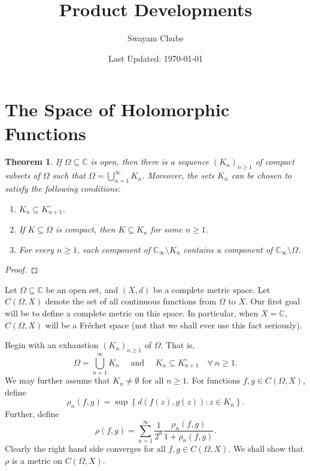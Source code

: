 \documentclass[11pt]{article}
\theoremstyle{thmstyle}
\newtheorem{theorem}{Theorem}[section]
\theoremstyle{defstyle}
\newcommand{\bbC}{\mathbb{C}}
\renewcommand{\ge}{\geqslant}
\begin{document}
\title{Product Developments}
\author{Swayam Chube}
\date{Last Updated: \today}
\maketitle
\tableofcontents

\section{The Space of Holomorphic Functions}

\begin{theorem}
    If $\Omega\subseteq\bbC$ is open, then there is a sequence $(K_n)_{n\ge 1}$ of compact subsets of $\Omega$ such that $\displaystyle\Omega = \bigcup_{n = 1}^\infty K_n$. Moreover, the sets $K_n$ can be chosen to satisfy the following conditions: 
    \begin{enumerate}[label=(\roman*)]
        \item $K_n\subseteq K_{n + 1}^\circ$.
        \item If $K\subseteq\Omega$ is compact, then $K\subseteq K_n$ for some $n\ge 1$. 
        \item For every $n\ge 1$, each component of $\bbC_\infty\setminus K_n$ contains a component of $\bbC_\infty\setminus\Omega$.
    \end{enumerate}
\end{theorem}
\begin{proof}
\end{proof}

Let $\Omega\subseteq\bbC$ be an open set, and $(X, d)$ be a complete metric space. Let $C(\Omega, X)$ denote the set of all continuous functions from $\Omega$ to $X$. Our first goal will be to define a complete metric on this space. In particular, when $X = \bbC$, $C(\Omega, X)$ will be a Fr\'echet space (not that we shall ever use this fact seriously).


Begin with an exhaustion $(K_n)_{n\ge 1}$ of $\Omega$. That is, 
\begin{equation*}
    \Omega = \bigcup_{n = 1}^\infty K_n\quad\text{ and }\quad K_n\subseteq K_{n + 1}^\circ\quad\forall~n\ge 1.
\end{equation*}
We may further assume that $K_n\ne\emptyset$ for all $n\ge 1$. For functions $f, g\in C(\Omega, X)$, define 
\begin{equation*}
    \rho_n(f, g) = \sup\left\{d(f(z), g(z))\colon z\in K_n\right\}.
\end{equation*}
Further, define 
\begin{equation}
    \rho(f, g) = \sum_{n = 1}^\infty \frac{1}{2^n}\frac{\rho_n(f, g)}{1 + \rho_n(f, g)}.\label{the-metric}\tag{$\clubsuit$}
\end{equation}
Clearly the right hand side converges for all $f, g\in C(\Omega, X)$. We shall show that $\rho$ is a metric on $C(\Omega, X)$.
\end{document}
